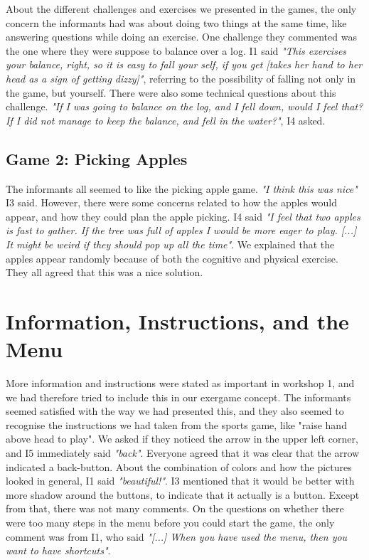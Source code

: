 About the different challenges and exercises we presented in the games, the only concern the informants had was about doing two things at the same time, like answering questions while doing an exercise. One challenge they commented was the one where they were suppose to balance over a log. I1 said \emph{"This exercises your balance, right, so it is easy to fall your self, if you get [takes her hand to her head as a sign of getting dizzy]"}, referring to the possibility of falling not only in the game, but yourself. There were also some technical questions about this challenge. \emph{"If I was going to balance on the log, and I fell down, would I feel that? If I did not manage to keep the balance, and fell in the water?"}, I4 asked. 

\subsection{Game 2: Picking Apples}

The informants all seemed to like the picking apple game. \emph{"I think this was nice"} I3 said. However, there were some concerns related to how the apples would appear, and how they could plan the apple picking. I4 said \emph{"I feel that two apples is fast to gather. If the tree was full of apples I would be more eager to play. [...] It might be weird if they should pop up all the time"}. We explained that the apples appear randomly because of both the cognitive and physical exercise. They all agreed that this was a nice solution. 


\section{Information, Instructions, and the Menu}

More information and instructions were stated as important in workshop 1, and we had therefore tried to include this in our exergame concept. The informants seemed satisfied with the way we had presented this, and they also seemed to recognise the instructions we had taken from the sports game, like "raise hand above head to play". We asked if they noticed the arrow in the upper left corner, and I5 immediately said \emph{"back"}. Everyone agreed that it was clear that the arrow indicated a back-button. About the combination of colors and how the pictures looked in general, I1 said \emph{"beautiful!"}. I3 mentioned that it would be better with more shadow around the buttons, to indicate that it actually is a button. Except from that, there was not many comments. On the questions on whether there were too many steps in the menu before you could start the game, the only comment was from I1, who said \emph{"[...] When you have used the menu, then you want to have shortcuts"}. 

